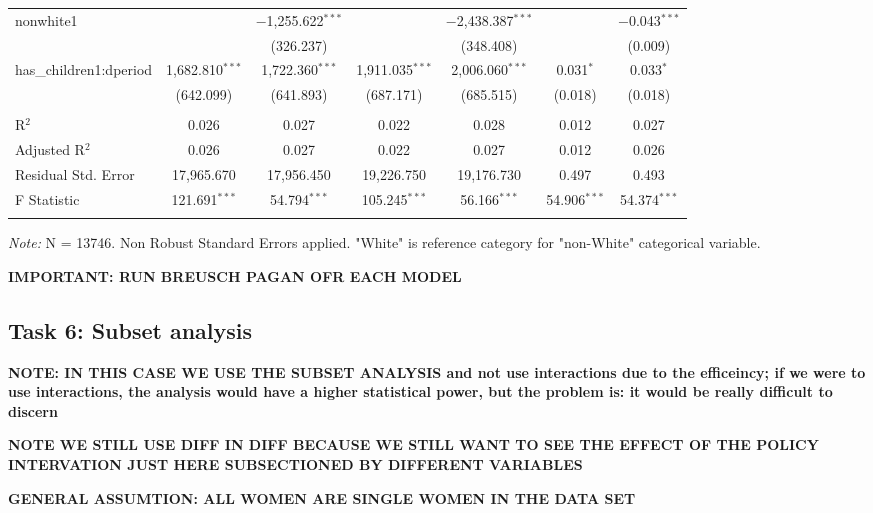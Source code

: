 \documentclass[a4paper]{article}
\begin{document}
\begin{table}[!htbp]
\begin{adjustwidth}{0.cm}{-0cm}
\begin{threeparttable}
\begin{tabular}{@{\extracolsep{-2pt}}lcccccc}
  nonwhite1 &  & $-$1,255.622$^{***}$ &  & $-$2,438.387$^{***}$ &  & $-$0.043$^{***}$ \\ 
  &  & (326.237) &  & (348.408) &  & (0.009) \\ 
  has\_children1:dperiod & 1,682.810$^{***}$ & 1,722.360$^{***}$ & 1,911.035$^{***}$ & 2,006.060$^{***}$ & 0.031$^{*}$ & 0.033$^{*}$ \\ 
  & (642.099) & (641.893) & (687.171) & (685.515) & (0.018) & (0.018) \\ 
 \hline \\[-1.8ex] 
R$^{2}$ & 0.026 & 0.027 & 0.022 & 0.028 & 0.012 & 0.027 \\ 
Adjusted R$^{2}$ & 0.026 & 0.027 & 0.022 & 0.027 & 0.012 & 0.026 \\ 
Residual Std. Error & 17,965.670 & 17,956.450  & 19,226.750  & 19,176.730 & 0.497  & 0.493  \\ 
F Statistic & 121.691$^{***}$ & 54.794$^{***}$ & 105.245$^{***}$ & 56.166$^{***}$  & 54.906$^{***}$  & 54.374$^{***}$  \\ 
\hline 
\hline \\[-3.5ex] 
\end{tabular} 
\begin{tablenotes}
      \small
      \item\textit{Note:} N = 13746. Non Robust Standard Errors applied. "White" is reference category for "non-White" categorical variable.
    \end{tablenotes}
\end{threeparttable}
\end{adjustwidth}
%
\end{table}


\textbf{IMPORTANT: RUN BREUSCH PAGAN OFR EACH MODEL}


\subsection{Task 6: Subset analysis}

\textbf{NOTE: IN THIS CASE WE USE THE SUBSET ANALYSIS and not use interactions due to the efficeincy; if we were to use interactions, the analysis would have a higher statistical power, but the problem is: it would be really difficult to discern }

\textbf{NOTE WE STILL USE DIFF IN DIFF BECAUSE WE STILL WANT TO SEE THE EFFECT OF THE POLICY INTERVATION JUST HERE SUBSECTIONED BY DIFFERENT VARIABLES }

\textbf{GENERAL ASSUMTION: ALL WOMEN ARE SINGLE WOMEN IN THE DATA SET}
\end{document}
